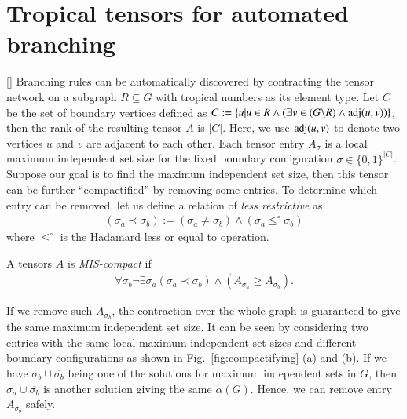 \documentclass[review,onefignum,onetabnum]{siamart190516}
\newcommand{\<}{\langle}
\renewcommand{\>}{\rangle}
\newcommand{\Fig}[1]{Fig.~\ref{#1}}
\newcommand{\blue}[1]{[{\bf  \color{blue}{JG: #1}}]}
\begin{document}
\section{Tropical tensors for automated branching}\blue{$?$}
Branching rules can be automatically discovered by contracting the tensor network on a subgraph $R \subseteq G$ with tropical numbers as its element type.
Let $C$ be the set of boundary vertices defined as $C := \{u | u\in R \land (\exists v \in (G\backslash R) \land {\rm adj}(u, v))\}$, then the rank of the resulting tensor $A$ is $|C|$.
Here, we use ${\rm adj}(u, v)$ to denote two vertices $u$ and $v$ are adjacent to each other.
Each tensor entry $A_{\sigma}$ is a local maximum independent set size for the fixed boundary configuration $\sigma \in \{0,1\}^{|C|}$.
Suppose our goal is to find the maximum independent set size,
then this tensor can be further ``compactified'' by removing some entries.
To determine which entry can be removed, let us define a relation of \textit{less restrictive} as
\begin{align}
(\sigma_a \prec \sigma_b) := (\sigma_a \neq \sigma_b) \land (\sigma_a \leq^\circ \sigma_b)
\end{align}
where $\leq^\circ$ is the Hadamard less or equal to operation.

\begin{definition}
A tensors $A$ is \textit{MIS-compact} if
\begin{align}
\forall{\sigma_b}\neg \exists{\sigma_a}(\sigma_a \prec \sigma_b) \land (A_{\sigma_a} \geq A_{\sigma_b})\label{eq:compactifying}.
\end{align}
\end{definition}

If we remove such $A_{\sigma_b}$, the contraction over the whole graph is guaranteed to give the same maximum independent set size.
It can be seen by considering two entries with the same local maximum independent set sizes and different boundary configurations as shown in \Fig{fig:compactifying} (a) and (b).
If we have $\sigma_b \cup \overline{\sigma_b}$ being one of the solutions for maximum independent sets in $G$, then $\sigma_a \cup \overline{\sigma_b}$ is another solution giving the same $\alpha(G)$.
Hence, we can remove entry $A_{\sigma_b}$ safely.
\end{document}
